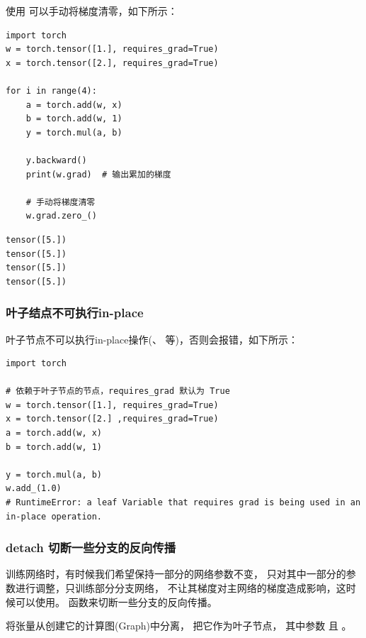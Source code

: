 使用  可以手动将梯度清零，如下所示：
\begin{lstlisting}[style=pythonstyle]
import torch
w = torch.tensor([1.], requires_grad=True)
x = torch.tensor([2.], requires_grad=True)

for i in range(4):
    a = torch.add(w, x)
    b = torch.add(w, 1)
    y = torch.mul(a, b)

    y.backward()   
    print(w.grad)  # 输出累加的梯度

    # 手动将梯度清零
    w.grad.zero_()  
\end{lstlisting}
\begin{lstlisting}[style=demostyle, numbers=none]
tensor([5.])
tensor([5.])
tensor([5.])
tensor([5.])
\end{lstlisting}                        


\subsubsection{叶子结点不可执行in-place}
\label{subsubsec:Pytorch的叶子结点不可执行in-place}
叶子节点不可以执行in-place操作(、
等)，否则会报错，如下所示：

\begin{lstlisting}[style=demostyle, numbers=none]
import torch
        
# 依赖于叶子节点的节点，requires_grad 默认为 True
w = torch.tensor([1.], requires_grad=True)
x = torch.tensor([2.] ,requires_grad=True)
a = torch.add(w, x)
b = torch.add(w, 1)

y = torch.mul(a, b)
w.add_(1.0)   
# RuntimeError: a leaf Variable that requires grad is being used in an in-place operation.
\end{lstlisting}

\subsubsection{detach 切断一些分支的反向传播}
\label{subsec:Pytorch的切断一些分支的反向传播}
训练网络时，有时候我们希望保持一部分的网络参数不变，
只对其中一部分的参数进行调整，只训练部分分支网络，
不让其梯度对主网络的梯度造成影响，这时候可以使用。
函数来切断一些分支的反向传播。

将张量从创建它的计算图(Graph)中分离，
把它作为叶子节点，
其中参数 且 。

